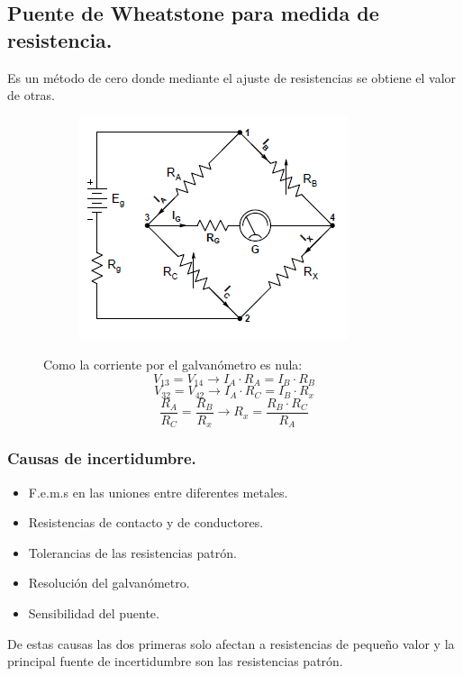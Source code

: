 \subsection{Puente de Wheatstone para medida de resistencia.}
Es un método de cero donde mediante el ajuste de resistencias se obtiene el valor de otras.
\begin{figure}[H]
	\begin{minipage}{0.5\textwidth}
		\begin{figure}[H]
			\centering
			\includegraphics[width=0.7\linewidth]{ImagenesTema4/12}
			\label{fig:9}
		\end{figure}\textbf{}	
	\end{minipage}
	\begin{minipage}{0.5\textwidth}
	Como la corriente por el galvanómetro es nula:
	\[V_{13}=V_{14}\rightarrow I_A\cdot R_A =I_B \cdot R_B\]
	\[V_{32}=V_{42}\rightarrow I_A\cdot R_C =I_B \cdot R_x\]
	\[\frac{R_A}{R_C}=\frac{R_B}{R_x}\rightarrow R_x=\frac{R_B \cdot R_C}{R_A}\]
	\end{minipage}
\end{figure}

\subsubsection{Causas de incertidumbre.}
\begin{itemize}
	\item F.e.m.s en las uniones entre diferentes metales.
	\item Resistencias de contacto y de conductores.
	\item Tolerancias de las resistencias patrón.
	\item Resolución del galvanómetro.
	\item Sensibilidad del puente.
\end{itemize}
De estas causas las dos primeras solo afectan a resistencias de pequeño valor y la principal fuente de incertidumbre son las resistencias patrón.
